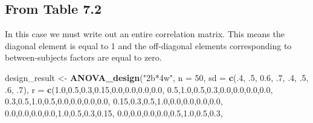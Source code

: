 \documentclass[]{book}
\newenvironment{Shaded}{\begin{snugshade}}{\end{snugshade}}
\newcommand{\DataTypeTok}[1]{\textcolor[rgb]{0.13,0.29,0.53}{#1}}
\newcommand{\DecValTok}[1]{\textcolor[rgb]{0.00,0.00,0.81}{#1}}
\newcommand{\FloatTok}[1]{\textcolor[rgb]{0.00,0.00,0.81}{#1}}
\newcommand{\KeywordTok}[1]{\textcolor[rgb]{0.13,0.29,0.53}{\textbf{#1}}}
\newcommand{\NormalTok}[1]{#1}
\newcommand{\StringTok}[1]{\textcolor[rgb]{0.31,0.60,0.02}{#1}}
\begin{document}
\hypertarget{from-table-7.2}{%
\subsection{From Table 7.2}\label{from-table-7.2}}

In this case we must write out an entire correlation matrix.
This means the diagonal element is equal to 1 and the off-diagonal elements corresponding to between-subjects factors are equal to zero.

\begin{Shaded}
\begin{Highlighting}[]
\NormalTok{design_result <-}\StringTok{ }\KeywordTok{ANOVA_design}\NormalTok{(}\StringTok{"2b*4w"}\NormalTok{,}
                              \DataTypeTok{n =} \DecValTok{50}\NormalTok{,}
                              \DataTypeTok{sd =} \KeywordTok{c}\NormalTok{(.}\DecValTok{4}\NormalTok{, }\FloatTok{.5}\NormalTok{, }\FloatTok{0.6}\NormalTok{, }\FloatTok{.7}\NormalTok{,}
                                     \FloatTok{.4}\NormalTok{, }\FloatTok{.5}\NormalTok{, }\FloatTok{.6}\NormalTok{, }\FloatTok{.7}\NormalTok{),}
                              \DataTypeTok{r =} \KeywordTok{c}\NormalTok{(}\FloatTok{1.0}\NormalTok{,}\FloatTok{0.5}\NormalTok{,}\FloatTok{0.3}\NormalTok{,}\FloatTok{0.15}\NormalTok{,}\FloatTok{0.0}\NormalTok{,}\FloatTok{0.0}\NormalTok{,}\FloatTok{0.0}\NormalTok{,}\FloatTok{0.0}\NormalTok{,}
                                    \FloatTok{0.5}\NormalTok{,}\FloatTok{1.0}\NormalTok{,}\FloatTok{0.5}\NormalTok{,}\FloatTok{0.3}\NormalTok{,}\FloatTok{0.0}\NormalTok{,}\FloatTok{0.0}\NormalTok{,}\FloatTok{0.0}\NormalTok{,}\FloatTok{0.0}\NormalTok{,}
                                    \FloatTok{0.3}\NormalTok{,}\FloatTok{0.5}\NormalTok{,}\FloatTok{1.0}\NormalTok{,}\FloatTok{0.5}\NormalTok{,}\FloatTok{0.0}\NormalTok{,}\FloatTok{0.0}\NormalTok{,}\FloatTok{0.0}\NormalTok{,}\FloatTok{0.0}\NormalTok{,}
                                    \FloatTok{0.15}\NormalTok{,}\FloatTok{0.3}\NormalTok{,}\FloatTok{0.5}\NormalTok{,}\FloatTok{1.0}\NormalTok{,}\FloatTok{0.0}\NormalTok{,}\FloatTok{0.0}\NormalTok{,}\FloatTok{0.0}\NormalTok{,}\FloatTok{0.0}\NormalTok{,}
                                    \FloatTok{0.0}\NormalTok{,}\FloatTok{0.0}\NormalTok{,}\FloatTok{0.0}\NormalTok{,}\FloatTok{0.0}\NormalTok{,}\FloatTok{1.0}\NormalTok{,}\FloatTok{0.5}\NormalTok{,}\FloatTok{0.3}\NormalTok{,}\FloatTok{0.15}\NormalTok{,}
                                    \FloatTok{0.0}\NormalTok{,}\FloatTok{0.0}\NormalTok{,}\FloatTok{0.0}\NormalTok{,}\FloatTok{0.0}\NormalTok{,}\FloatTok{0.5}\NormalTok{,}\FloatTok{1.0}\NormalTok{,}\FloatTok{0.5}\NormalTok{,}\FloatTok{0.3}\NormalTok{,}

\end{Highlighting}
\end{Shaded}
\end{document}
